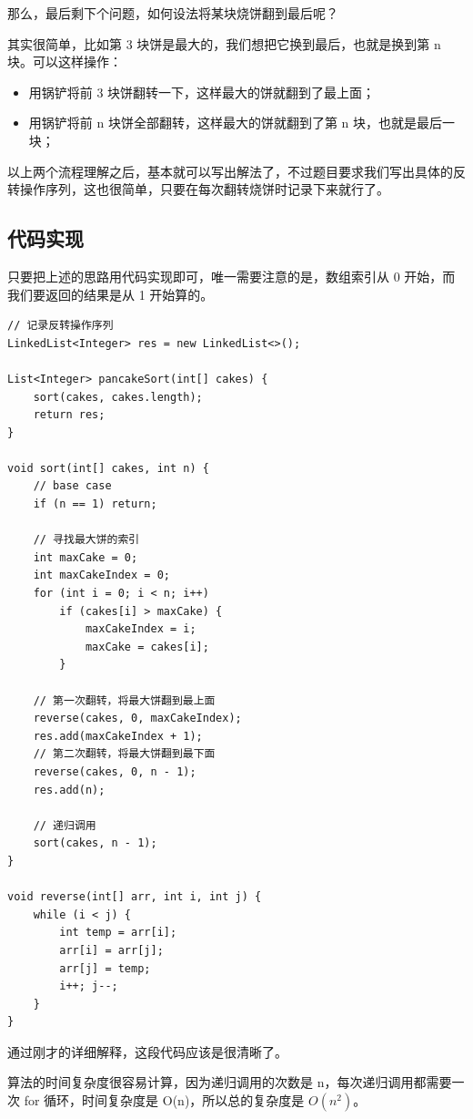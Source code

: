 \documentclass[12pt]{article}
\begin{document}
那么，最后剩下个问题，如何设法将某块烧饼翻到最后呢？

其实很简单，比如第 3 块饼是最大的，我们想把它换到最后，也就是换到第 n 块。可以这样操作：
\begin{itemize}
\setlength{\itemsep}{0pt}
\setlength{\parsep}{0pt}
\setlength{\parskip}{0pt}
    \item 用锅铲将前 3 块饼翻转一下，这样最大的饼就翻到了最上面；
    \item 用锅铲将前 n 块饼全部翻转，这样最大的饼就翻到了第 n 块，也就是最后一块；
\end{itemize}

以上两个流程理解之后，基本就可以写出解法了，不过题目要求我们写出具体的反转操作序列，这也很简单，只要在每次翻转烧饼时记录下来就行了。

\subsection{代码实现}
只要把上述的思路用代码实现即可，唯一需要注意的是，数组索引从 0 开始，而我们要返回的结果是从 1 开始算的。
\begin{lstlisting}
// 记录反转操作序列
LinkedList<Integer> res = new LinkedList<>();

List<Integer> pancakeSort(int[] cakes) {
    sort(cakes, cakes.length);
    return res;
}

void sort(int[] cakes, int n) {
    // base case
    if (n == 1) return;
    
    // 寻找最大饼的索引
    int maxCake = 0;
    int maxCakeIndex = 0;
    for (int i = 0; i < n; i++)
        if (cakes[i] > maxCake) {
            maxCakeIndex = i;
            maxCake = cakes[i];
        }
    
    // 第一次翻转，将最大饼翻到最上面
    reverse(cakes, 0, maxCakeIndex);
    res.add(maxCakeIndex + 1);
    // 第二次翻转，将最大饼翻到最下面
    reverse(cakes, 0, n - 1);
    res.add(n);

    // 递归调用
    sort(cakes, n - 1);
}

void reverse(int[] arr, int i, int j) {
    while (i < j) {
        int temp = arr[i];
        arr[i] = arr[j];
        arr[j] = temp;
        i++; j--;
    }
}
\end{lstlisting}

通过刚才的详细解释，这段代码应该是很清晰了。

算法的时间复杂度很容易计算，因为递归调用的次数是 n，每次递归调用都需要一次 for 循环，时间复杂度是 O(n)，所以总的复杂度是 $O(n^2)$。
\end{document}
